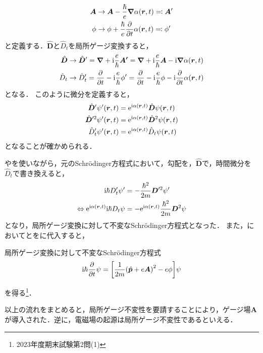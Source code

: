\documentclass{report}
\begin{document}
  \begin{align}
    \bm{A} &\to \bm{A} - \frac{\hbar}{e}\grad\alpha(\bm{r}, t) \eqqcolon \bm{A}' \\ 
    \phi &\to \phi + \frac{\hbar}{e}\pdv{t}\alpha(\bm{r}, t) \eqqcolon \phi' 
  \end{align}
  と定義する．$\hat{\bm{D}}$と$\hat{D}_t$を局所ゲージ変換すると，
  \begin{align}
    \hat{\bm{D}} &\to \hat{\bm{D}}' = \grad + \mathrm{i}\frac{e}{\hbar}\bm{A'} = \grad + \mathrm{i}\frac{e}{\hbar}\bm{A} - \mathrm{i}\grad\alpha(\bm{r}, t) \\ 
    \hat{D}_t &\to \hat{D}_t' = \pdv{t} - \mathrm{i}\frac{e}{\hbar}\phi' = \pdv{t} - \mathrm{i}\frac{e}{\hbar}\phi - \mathrm{i}\pdv{t}\alpha(\bm{r}, t)
  \end{align}
  となる．
  このように微分を定義すると，
  \begin{align}
    \hat{\bm{D}}'\psi'(\bm{r}, t) &= \mathrm{e}^{\mathrm{i}\alpha(\bm{r}, t)}\hat{\bm{D}}\psi(\bm{r}, t) \label{d-prime}\\ 
    \hat{\bm{D}}'^2\psi'(\bm{r}, t) &= \mathrm{e}^{\mathrm{i}\alpha(\bm{r}, t)}\hat{\bm{D}}^2\psi(\bm{r}, t) \label{d-prime-power}\\ 
    \hat{D}_t'\psi'(\bm{r}, t) &= \mathrm{e}^{\mathrm{i}\alpha(\bm{r}, t)}\hat{D}_t\psi(\bm{r}, t) \label{dt-prime}
  \end{align}
  となることが確かめられる．
  \par
  やを使いながら，元のSchr\"odinger方程式において，勾配を，$\hat{\bm{D}}$で，時間微分を$\hat{D}_t$で書き換えると，
  \begin{align}
    \mathrm{i}\hbar D'_t\psi' &= -\frac{\hbar^2}{2m}\bm{D}'^2\psi' \\
    \Leftrightarrow \mathrm{e}^{\mathrm{i}\alpha(\bm{r}, t)}\mathrm{i}\hbar D_t\psi &= -\mathrm{e}^{\mathrm{i}\alpha(\bm{r}, t)}\frac{\hbar^2}{2m}\bm{D}^2\psi\label{local-gauge-psi}
  \end{align}
  となり，局所ゲージ変換に対して不変なSchrödinger方程式となった．
  また，においてとをに代入すると，
  \begin{itembox}[l]{局所ゲージ変換に対して不変なSchrödinger方程式}
    \begin{align}
      \mathrm{i}\hbar\pdv{t}\psi = \qty[\frac{1}{2m}\qty(\hat{\bm{p}} + e\bm{A})^2 - e\phi]\psi
    \end{align}
  \end{itembox}
  を得る\footnote{2023年度期末試験第2問(1)}．
  \par
  以上の流れをまとめると，局所ゲージ不変性を要請することにより，ゲージ場$\bm{A}$が導入された．逆に，電磁場の起源は局所ゲージ不変性であるといえる．
\end{document}
